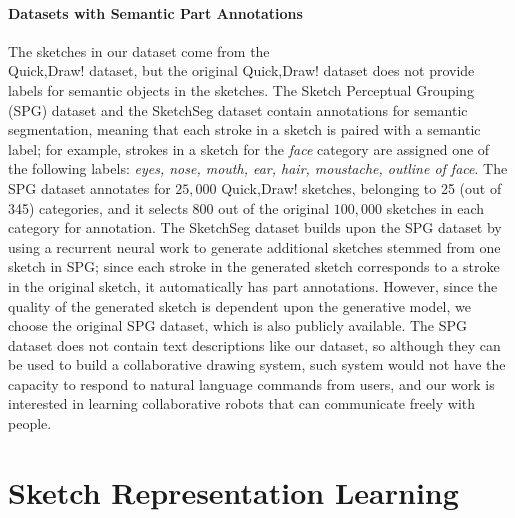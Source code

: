 \paragraph{Datasets with Semantic Part Annotations}
The sketches in our dataset come from the \\
Quick,Draw! dataset, but the original Quick,Draw! dataset does not provide labels for semantic objects in the sketches. 
The Sketch Perceptual Grouping (SPG) dataset \citep{spg_paper} and the SketchSeg dataset \citep{sketchsegDataset} contain annotations for semantic segmentation, meaning that each stroke in a sketch is paired with a semantic label; for example, strokes in a sketch for the \textit{face} category are assigned one of the following labels: \textit{eyes, nose, mouth, ear, hair, moustache, outline of face}. 
The SPG dataset annotates for $25,000$ Quick,Draw! sketches, belonging to 25 (out of 345) categories, and it selects 800 out of the original $100,000$ sketches in each category for annotation. 
The SketchSeg dataset builds upon the SPG dataset by using a recurrent neural work to generate additional sketches stemmed from one sketch in SPG; since each stroke in the generated sketch corresponds to a stroke in the original sketch, it automatically has part annotations. However, since the quality of the generated sketch is dependent upon the generative model, we choose the original SPG dataset, which is also publicly available. The SPG dataset does not contain text descriptions like our dataset, so although they can be used to build a collaborative drawing system, such system would not have the capacity to respond to natural language commands from users, and our work is interested in learning collaborative robots that can communicate freely with people.    

\section{Sketch Representation Learning}


